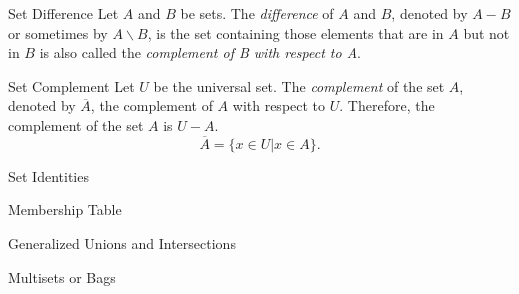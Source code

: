 \documentclass [handout]{beamer}
\begin{document}
 \begin{frame}{Set Difference}
 Let $A$ and $B$ be sets. The \textit{difference} of $A$ and $B$, denoted by $A-B$ or sometimes by $A \backslash B$, is the set containing those elements that are in $A$ but not in $B$ is also called the \textit{complement of B with respect to A}.
 \end{frame}
 
 \begin{frame}{Set Complement}
 Let $U$ be the universal set. The \textit{complement} of the set $A$, denoted by $\overline{A}$, the complement of $A$ with respect to $U$. Therefore, the complement of the set $A$ is $U-A$.
 \begin{displaymath}
 \overline{A}=\{x\in U | x\in A\}.
 \end{displaymath}
 \end{frame}
 
 \begin{frame}{Set Identities}
 
 
 \end{frame}
 
 \begin{frame}{Membership Table}
 
 \end{frame}
 
 \begin{frame}{Generalized Unions and Intersections}
 \end{frame}
 
 \begin{frame}{Multisets or Bags}
 \end{frame} 
 
\end{document}
